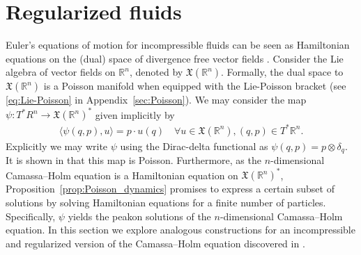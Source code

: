 \documentclass[12pt]{amsart}
\begin{document}
\section{Regularized fluids}
\label{sec:reg_fluids}
  Euler's equations of motion for incompressible fluids can be seen as
  Hamiltonian equations on the (dual) space of divergence
  free vector fields \cite{Arnold1966}.
  Consider the Lie algebra of vector fields on $\mathbb{R}^n$,
  denoted by $\mathfrak{X}(\mathbb{R}^n)$.
  Formally, the dual space to $\mathfrak{X}(\mathbb{R}^n)$ is a Poisson
  manifold when equipped with the Lie-Poisson bracket
  (see \eqref{eq:Lie-Poisson} in Appendix~\ref{sec:Poisson}).
  We may consider the map
  $\psi: T^*R^n \to \mathfrak{X}(\mathbb{R}^n)^*$
  given implicitly by
  \begin{align*}
    \langle \psi(q,p) , u \rangle = p \cdot u(q) \quad
    \forall u \in \mathfrak{X}(\mathbb{R}^n), (q,p) \in T^*\mathbb{R}^n.
  \end{align*}
  Explicitly we may write $\psi$ using the Dirac-delta
  functional as $\psi(q,p) = p \otimes \delta_q$.
  It is shown in \cite{HolmMarsden2005} that this map is Poisson.
  Furthermore, as the $n$-dimensional Camassa--Holm equation \cite{CamassaHolm1993} is a
  Hamiltonian equation on $\mathfrak{X}(\mathbb{R}^n)^*$,
  Proposition~\ref{prop:Poisson_dynamics} promises to express a 
  certain subset
  of solutions by solving Hamiltonian equations for a finite number
  of particles.
  Specifically, $\psi$ yields the peakon solutions of the $n$-dimensional
  Camassa--Holm equation.
  In this section we explore analogous constructions for
  an incompressible and regularized version of the
  Camassa--Holm equation discovered in \cite{MumfordMichor2013}.
\end{document}

